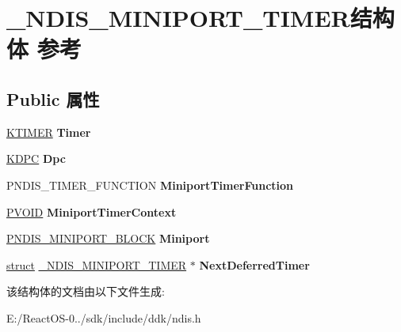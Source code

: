 \hypertarget{struct___n_d_i_s___m_i_n_i_p_o_r_t___t_i_m_e_r}{}\section{\+\_\+\+N\+D\+I\+S\+\_\+\+M\+I\+N\+I\+P\+O\+R\+T\+\_\+\+T\+I\+M\+E\+R结构体 参考}
\label{struct___n_d_i_s___m_i_n_i_p_o_r_t___t_i_m_e_r}
\subsection*{Public 属性}
\begin{DoxyCompactItemize}
\item 
\mbox{\label{struct___n_d_i_s___m_i_n_i_p_o_r_t___t_i_m_e_r_a62740da466d52ea54e18bc45d9bd995b}} 
\hyperlink{struct___k_t_i_m_e_r}{K\+T\+I\+M\+ER} {\bfseries Timer}
\item 
\mbox{\label{struct___n_d_i_s___m_i_n_i_p_o_r_t___t_i_m_e_r_a7a761fb9591130ce06b5bc30959f49fd}} 
\hyperlink{struct___k_d_p_c}{K\+D\+PC} {\bfseries Dpc}
\item 
\mbox{\label{struct___n_d_i_s___m_i_n_i_p_o_r_t___t_i_m_e_r_a748bb36d861ba7371e803efb6998ad2f}} 
P\+N\+D\+I\+S\+\_\+\+T\+I\+M\+E\+R\+\_\+\+F\+U\+N\+C\+T\+I\+ON {\bfseries Miniport\+Timer\+Function}
\item 
\mbox{\label{struct___n_d_i_s___m_i_n_i_p_o_r_t___t_i_m_e_r_a1520540a2a9b1be4cb97062d44f08f38}} 
\hyperlink{interfacevoid}{P\+V\+O\+ID} {\bfseries Miniport\+Timer\+Context}
\item 
\mbox{\label{struct___n_d_i_s___m_i_n_i_p_o_r_t___t_i_m_e_r_afcd6ca8338ecfd31a5e4087d848b6233}} 
\hyperlink{struct___n_d_i_s___m_i_n_i_p_o_r_t___b_l_o_c_k}{P\+N\+D\+I\+S\+\_\+\+M\+I\+N\+I\+P\+O\+R\+T\+\_\+\+B\+L\+O\+CK} {\bfseries Miniport}
\item 
\mbox{\label{struct___n_d_i_s___m_i_n_i_p_o_r_t___t_i_m_e_r_a127a4902a273be59be740e5725a65166}} 
\hyperlink{interfacestruct}{struct} \hyperlink{struct___n_d_i_s___m_i_n_i_p_o_r_t___t_i_m_e_r}{\+\_\+\+N\+D\+I\+S\+\_\+\+M\+I\+N\+I\+P\+O\+R\+T\+\_\+\+T\+I\+M\+ER} $\ast$ {\bfseries Next\+Deferred\+Timer}
\end{DoxyCompactItemize}


该结构体的文档由以下文件生成\+:\begin{DoxyCompactItemize}
\item 
E\+:/\+React\+O\+S-\/0../sdk/include/ddk/ndis.\+h\end{DoxyCompactItemize}
